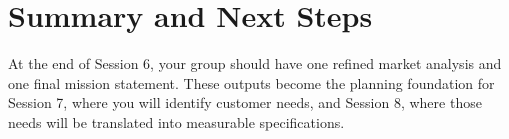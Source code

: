 \section{Summary and Next Steps}

At the end of Session 6, your group should have one refined market analysis and one final mission statement. These outputs become the planning foundation for Session 7, where you will identify customer needs, and Session 8, where those needs will be translated into measurable specifications.
